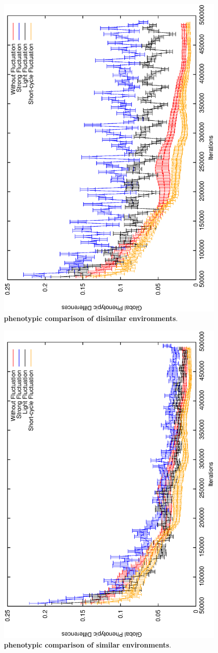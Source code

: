 \begin{figure}[h]
\centering
\includegraphics[width=0.7\columnwidth, angle =-90 ]{img/diffProp}
\caption{\textbf{phenotypic comparison of disimilar environments}.}
\label{fig:disimilar}
\end{figure}

\begin{figure}[h]
\centering
\includegraphics[width=0.7\columnwidth, angle =-90 ]{img/ProgressProp}
\caption{\textbf{phenotypic comparison of similar environments}.}
\label{fig:similar}
\end{figure}




